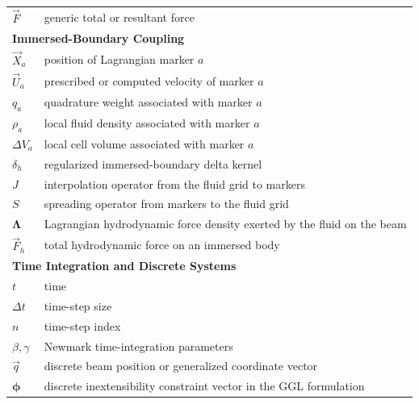 \begin{longtable}[l]{p{} p{}}
    $\vec F$               & generic total or resultant force                                        \\
    \multicolumn{2}{l}{\textbf{Immersed-Boundary Coupling}}                                          \\
    $\vec X_a$             & position of Lagrangian marker $a$                                       \\
    $\vec U_a$             & prescribed or computed velocity of marker $a$                           \\
    $q_a$                  & quadrature weight associated with marker $a$                            \\
    $\rho_a$               & local fluid density associated with marker $a$                          \\
    $\Delta V_a$           & local cell volume associated with marker $a$                            \\
    $\delta_h$             & regularized immersed-boundary delta kernel                              \\
    $J$                    & interpolation operator from the fluid grid to markers                   \\
    $S$                    & spreading operator from markers to the fluid grid                       \\
    $\bm\Lambda$           & Lagrangian hydrodynamic force density exerted by the fluid on the beam  \\
    $\vec F_h$             & total hydrodynamic force on an immersed body                            \\
    \multicolumn{2}{l}{\textbf{Time Integration and Discrete Systems}}                               \\
    $t$                    & time                                                                    \\
    $\Delta t$             & time-step size                                                          \\
    $n$                    & time-step index                                                         \\
    $\beta,\gamma$         & Newmark time-integration parameters                                     \\
    $\vec q$               & discrete beam position or generalized coordinate vector                 \\
    $\bm\phi$              & discrete inextensibility constraint vector in the GGL formulation       \\

\end{longtable}
